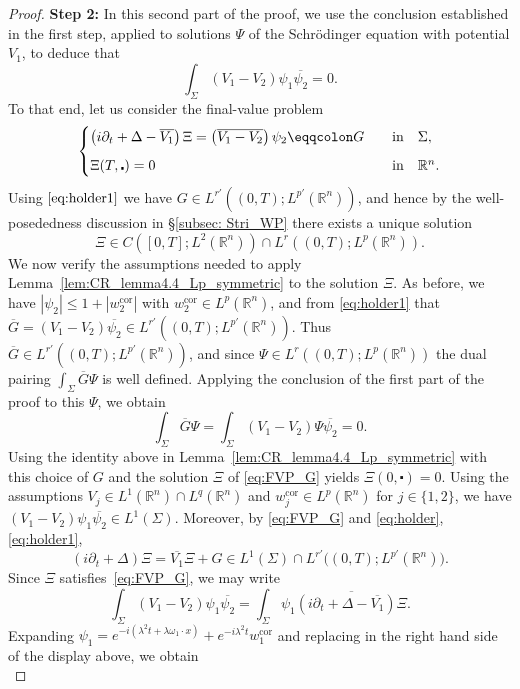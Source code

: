 \documentclass[11pt,a4paper]{amsart}
\theoremstyle{remark}
\theoremstyle{definition}
\newcommand{\R}{\mathbb{R}}
\def\ovl{\overline}
\def\cd{\centerdot}
\def\d{\partial}
\begin{document}
\begin{proof}
\vspace{1em}
\noindent\textbf{Step 2:} In this second part of the proof, we use the conclusion established in the first step, applied to solutions $\Psi$ of the Schrödinger equation with potential $V_1$, to deduce that
\[
\int_\Sigma (V_1-V_2)\psi_1\ovl{\psi_2}=0.
\]
To that end, let us consider the final-value problem
\begin{equation}\label{eq:FVP_G}
\begin{cases}
\left(i\d_t + \Delta - \ovl{V_1}\right)\Xi= \left(\ovl{V_1-V_2}\right)\psi_2 \eqqcolon G  \quad &\textrm{in}\quad \Sigma, 
\vspace{.6em}\\
\Xi(T,\cd) = 0   \quad &\textrm{in}\quad \R^n.
\end{cases}
\end{equation}
Using $\eqref{eq:holder1}$ we have $G\in L^{r'}((0,T);L^{p'}(\R^n))$, and hence by the well-posededness discussion in \S\ref{subsec: Stri_WP} there exists a unique solution
\[
\Xi\in C\left([0,T];L^2(\R^n)\right)\cap L^r\left((0,T);L^p(\R^n)\right).
\]
We now verify the assumptions needed to apply Lemma~\ref{lem:CR_lemma4.4_Lp_symmetric} to the solution $\Xi$. As before, we have $ | \psi_2 | \leq 1 + |w^{\mathrm{cor}}_2| $ with $w^{\mathrm{cor}}_2 \in L^p(\R^n)$, and from \eqref{eq:holder1} that $\ovl{G} = (V_1 - V_2)\ovl{\psi_2} \in L^{r'}((0, T); L^{p'}(\R^n))$. Thus $\ovl{G}\in L^{r'}((0,T);L^{p'}(\R^n))$, and since $\Psi\in L^r((0,T);L^p(\R^n))$
the dual pairing $\int_\Sigma \ovl{G} \Psi$ is well defined. Applying the conclusion of the first part of the proof to this $\Psi$, we obtain
\[
\int_\Sigma \ovl{G} \Psi = \int_\Sigma (V_1 - V_2)\Psi\ovl{\psi_2} = 0 .
\]
Using the identity above in Lemma~\ref{lem:CR_lemma4.4_Lp_symmetric} with this choice of $G$ and the solution $\Xi$ of \eqref{eq:FVP_G} yields $\Xi(0,\cd)=0$. Using the assumptions $V_j\in L^1(\R^n)\cap L^q(\R^n)$ and $w^{\mathrm{cor}}_j\in L^p(\R^n)$ for $j\in\{1,2\}$, we have $(V_1-V_2)\psi_1\ovl{\psi_2}\in L^1(\Sigma)$. Moreover, by \eqref{eq:FVP_G} and \eqref{eq:holder}, \eqref{eq:holder1}, 
\[
\left(i\partial_t+\Delta\right)\Xi=\ovl{V_1}\Xi+G \in L^1(\Sigma)\cap L^{r'}\big((0,T);L^{p'}(\R^n)\big).
\]
Since $\Xi$ satisfies~\eqref{eq:FVP_G}, we may write
\[
\int_\Sigma (V_1 - V_2)\psi_1 \ovl{\psi_2} = \int_\Sigma \psi_1 \ovl{\left(i\d_t + \Delta - \ovl{V_1}\right) \Xi}.
\]
Expanding $\psi_1=e^{-i(\lambda^2 t+\lambda\omega_1\cdot x)}+e^{-i\lambda^2 t}w^{\mathrm{cor}}_1$ and replacing in the right hand side of the display above, we obtain
\begin{equation}\label{eq:long}

\end{equation}
\end{proof}
\end{document}
